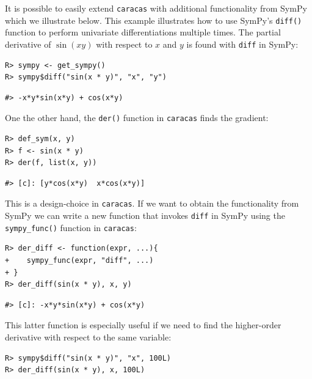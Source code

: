It is possible to easily extend \texttt{caracas} with additional
functionality from SymPy which we illustrate below. This example
illustrates how to use SymPy's \texttt{diff()} function to perform univariate
differentiations multiple times. The partial derivative of \(\sin(xy)\)
with respect to \(x\) and \(y\) is found with \texttt{diff} in SymPy:

\begin{verbatim}
R> sympy <- get_sympy()
R> sympy$diff("sin(x * y)", "x", "y")
\end{verbatim}

\begin{verbatim}
#> -x*y*sin(x*y) + cos(x*y)
\end{verbatim}

One the other hand, the \texttt{der()} function in \texttt{caracas} finds the gradient:

\begin{verbatim}
R> def_sym(x, y)
R> f <- sin(x * y) 
R> der(f, list(x, y))
\end{verbatim}

\begin{verbatim}
#> [c]: [y*cos(x*y)  x*cos(x*y)]
\end{verbatim}

This is a design-choice in \texttt{caracas}. If we want to obtain
the functionality from SymPy
we can write a new function that invokes \texttt{diff} in SymPy using the
\texttt{sympy\_func()} function in \texttt{caracas}:

\begin{verbatim}
R> der_diff <- function(expr, ...){
+    sympy_func(expr, "diff", ...)
+ }
R> der_diff(sin(x * y), x, y)
\end{verbatim}

\begin{verbatim}
#> [c]: -x*y*sin(x*y) + cos(x*y)
\end{verbatim}

This latter function is especially useful if we need to find the higher-order
derivative with respect to the same variable:

\begin{verbatim}
R> sympy$diff("sin(x * y)", "x", 100L)
R> der_diff(sin(x * y), x, 100L)
\end{verbatim}



